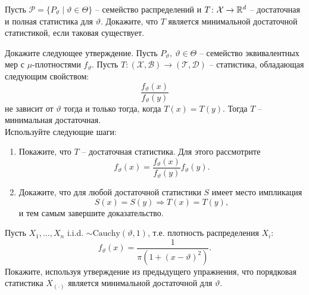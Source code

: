 \begin{exc}
	Пусть $\mathcal{P}= \{ P_\vartheta \mid \vartheta \in \Theta \}$ -- семейство распределений и $T\colon\mathcal{X} \rightarrow \mathbb{R}^d$ -- достаточная и полная статистика для $\vartheta$. Докажите, что $T$ является минимальной достаточной статистикой, если таковая существует.
\end{exc}

\begin{exc}
	Докажите следующее утверждение. Пусть $P_\vartheta,\ \vartheta \in \Theta$ -- семейство эквивалентных мер с $\mu$-плотностями $f_\vartheta$. Пусть $T\colon (\mathcal{X}, \mathcal{B}) \rightarrow (\mathcal{T}, \mathcal{D})$ -- статистика, обладающая следующим свойством:
	\[\frac{f_\vartheta(x)}{f_\vartheta(y)} \]
	не зависит от $\vartheta$ тогда и только тогда, когда $T(x) = T(y)$. Тогда $T$ -- минимальная достаточная. \\
	Используйте следующие шаги:
	\begin{enumerate}
		\item Покажите, что $T$ -- достаточная статистика. Для этого рассмотрите
		\[f_\vartheta(x) = \frac{f_\vartheta(x)}{f_\vartheta(y)} f_\vartheta(y). \]
		\item Докажите, что для любой достаточной статистики $S$ имеет место импликация
		\[ S(x) = S(y) \Longrightarrow T(x) = T(y), \]
		и тем самым завершите доказательство.
	\end{enumerate}
\end{exc}

\begin{exc}
	Пусть $X_1, \dots, X_n$ i.i.d. $\sim \mathrm{Cauchy}(\vartheta, 1)$, т.е. плотность распределения $X_i$:
	\[ f_\vartheta(x) = \frac{1}{\pi (1 + (x-\vartheta)^2)}. \]
	Покажите, используя утверждение из предыдущего упражнения, что порядковая статистика $X_{(\cdot)}$ является минимальной достаточной для $\vartheta$.
\end{exc}